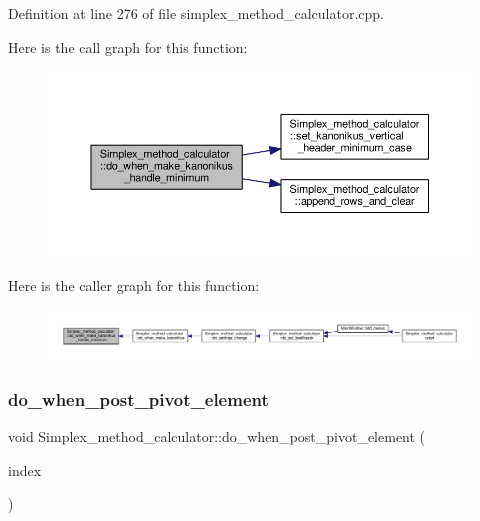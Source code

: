 Definition at line 276 of file simplex\+\_\+method\+\_\+calculator.\+cpp.

Here is the call graph for this function\+:\nopagebreak
\begin{figure}[H]
\begin{center}
\leavevmode
\includegraphics[width=350pt]{classSimplex__method__calculator_a61d301b932d1206f967048888c292d4b_cgraph}
\end{center}
\end{figure}
Here is the caller graph for this function\+:\nopagebreak
\begin{figure}[H]
\begin{center}
\leavevmode
\includegraphics[width=350pt]{classSimplex__method__calculator_a61d301b932d1206f967048888c292d4b_icgraph}
\end{center}
\end{figure}
\mbox{\label{classSimplex__method__calculator_aea11e77d951c1d5f5e09d366d0d0a556}} 
\subsubsection{\texorpdfstring{do\+\_\+when\+\_\+post\+\_\+pivot\+\_\+element}{do\_when\_post\_pivot\_element}}
{\footnotesize\ttfamily void Simplex\+\_\+method\+\_\+calculator\+::do\+\_\+when\+\_\+post\+\_\+pivot\+\_\+element (\begin{DoxyParamCaption}\item[{Q\+Model\+Index}]{index }\end{DoxyParamCaption})\hspace{0.3cm}{\ttfamily [slot]}}



